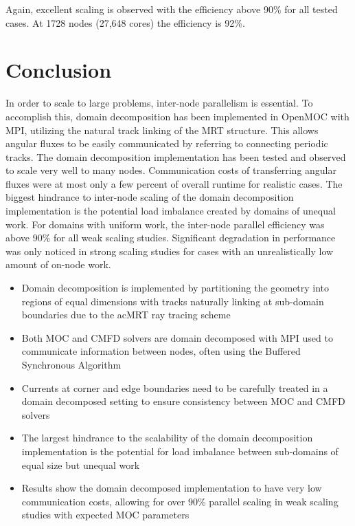 Again, excellent scaling is observed with the efficiency above 90\% for all tested cases. At 1728 nodes (27,648 cores) the efficiency is 92\%.

\newpage
\section{Conclusion}
\label{sec:dd-conclusion}

In order to scale to large problems, inter-node parallelism is essential. To accomplish this, domain decomposition has been implemented in OpenMOC with \ac{MPI}, utilizing the natural track linking of the \ac{MRT} structure. This allows angular fluxes to be easily communicated by referring to connecting periodic tracks. The domain decomposition implementation has been tested and observed to scale very well to many nodes. Communication costs of transferring angular fluxes were at most only a few percent of overall runtime for realistic cases. The biggest hindrance to inter-node scaling of the domain decomposition implementation is the potential load imbalance created by domains of unequal work. For domains with uniform work, the inter-node parallel efficiency was above 90\% for all weak scaling studies. Significant degradation in performance was only noticed in strong scaling studies for cases with an unrealistically low amount of on-node work.

\newpage
\vfill
\begin{highlightsbox}[frametitle=Highlights]
	\begin{itemize}
		\item Domain decomposition is implemented by partitioning the geometry into regions of equal dimensions with tracks naturally linking at sub-domain boundaries due to the ac{MRT} ray tracing scheme
		\item Both \ac{MOC} and \ac{CMFD} solvers are domain decomposed with \ac{MPI} used to communicate information between nodes, often using the Buffered Synchronous Algorithm
		\item Currents at corner and edge boundaries need to be carefully treated in a domain decomposed setting to ensure consistency between \ac{MOC} and \ac{CMFD} solvers
		\item The largest hindrance to the scalability of the domain decomposition implementation is the potential for load imbalance between sub-domains of equal size but unequal work
		\item Results show the domain decomposed implementation to have very low communication costs, allowing for over 90\% parallel scaling in weak scaling studies with expected \ac{MOC} parameters
		
	\end{itemize}
\end{highlightsbox}
\vfill